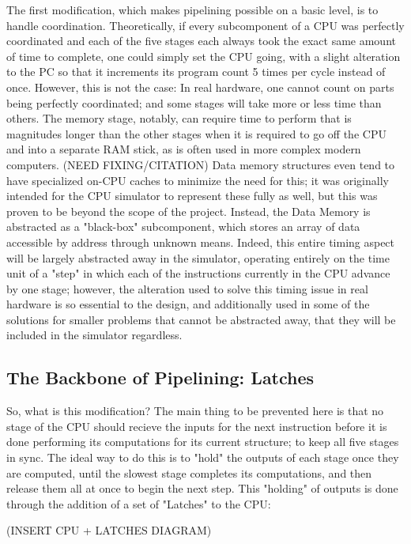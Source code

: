 \documentclass[12pt,twoside]{reedthesis}
\begin{document}
The first modification, which makes pipelining possible on a basic level, is to handle coordination. Theoretically, if  every subcomponent of a CPU was perfectly coordinated and each of the five stages each always took the exact same amount of time to complete, one could simply set the CPU going, with a slight alteration to the PC so that it increments its program count 5 times per cycle instead of once. However, this is not the case: In real hardware, one cannot count on parts being perfectly coordinated; and some stages will take more or less time than others. The memory stage, notably, can require time to perform that is magnitudes longer than the other stages when it is required to go off the CPU and into a separate RAM stick, as is often used in more complex modern computers. (NEED FIXING/CITATION) Data memory structures even tend to have specialized on-CPU caches to minimize the need for this; it was originally intended for the CPU simulator to represent these fully as well, but this was proven to be beyond the scope of the project. Instead, the Data Memory is abstracted as a "black-box" subcomponent, which stores an array of data accessible by address through unknown means. Indeed, this entire timing aspect will be largely abstracted away in the simulator, operating entirely on the time unit of a "step" in which each of the instructions currently in the CPU advance by one stage; however, the alteration used to solve this timing issue in real hardware is so essential to the design, and additionally used in some of the solutions for smaller problems that cannot be abstracted away, that they will be included in the simulator regardless.

\subsection{The Backbone of Pipelining: Latches}

So, what is this modification? The main thing to be prevented here is that no stage of the CPU should recieve the inputs for the next instruction before it is done performing its computations for its current structure; to keep all five stages in sync. The ideal way to do this is to "hold" the outputs of each stage once they are computed, until the slowest stage completes its computations, and then release them all at once to begin the next step. This "holding" of outputs is done through the addition of a set of "Latches" to the CPU:

(INSERT CPU + LATCHES DIAGRAM)
\end{document}
